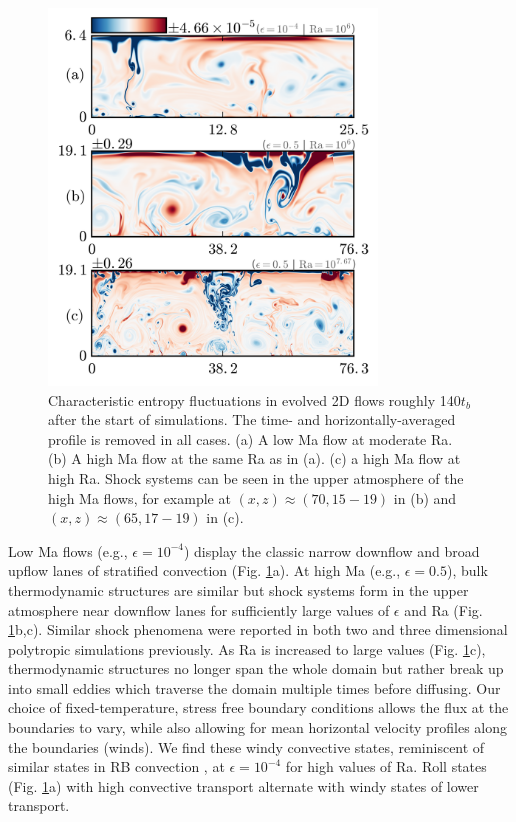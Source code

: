 \documentclass[aps, prl, twocolumn, nofootinbib, groupedaddress, amsfonts, amssymb, amsmath]{revtex4-1}
\begin{document}
\begin{figure}[t]
\includegraphics[width=3.4375in]{./figs/snapshots_fig.png}
\caption{Characteristic entropy fluctuations in evolved 2D flows roughly
140$t_b$ after the start of simulations. 
The time- and horizontally-averaged profile is removed in all cases.  
(a) A low Ma flow at moderate Ra. (b) A high Ma flow at the same Ra as in (a).
(c) a high Ma flow at high Ra.
Shock systems can be seen in the upper atmosphere of the high Ma flows,
for example at $(x, z) \approx (70, 15-19)$ in (b) and $(x, z) \approx 
(65, 17-19)$ in (c).
\label{fig:entropy_snapshots} }
\end{figure}

Low Ma flows (e.g., $\epsilon = 10^{-4}$)
display the classic narrow downflow and broad upflow lanes of stratified
convection (Fig. \ref{fig:entropy_snapshots}a).
At high Ma (e.g., $\epsilon = 0.5$), bulk thermodynamic structures are similar but
shock systems form in the upper atmosphere near downflow lanes 
for sufficiently large values of $\epsilon$ and Ra (Fig. \ref{fig:entropy_snapshots}b,c).
Similar shock phenomena were reported in
both two \cite{cattaneo&all1990} and 
three \cite{malagoli&all1990} dimensional polytropic simulations previously.
As Ra is increased to large values 
(Fig. \ref{fig:entropy_snapshots}c), thermodynamic structures 
no longer span the whole domain but rather break up into 
small eddies which traverse the domain multiple
times before diffusing.  Our choice of fixed-temperature, stress free boundary conditions 
allows the flux at the boundaries to vary, while also allowing
for mean horizontal velocity profiles along the boundaries (winds).
We find these windy convective states, reminiscent of similar states
in RB convection \cite{goluskin&all2014}, at $\epsilon = 10^{-4}$ for high
values of Ra. Roll states (Fig. \ref{fig:entropy_snapshots}a) with high convective
transport alternate with windy states of lower transport.
\end{document}
